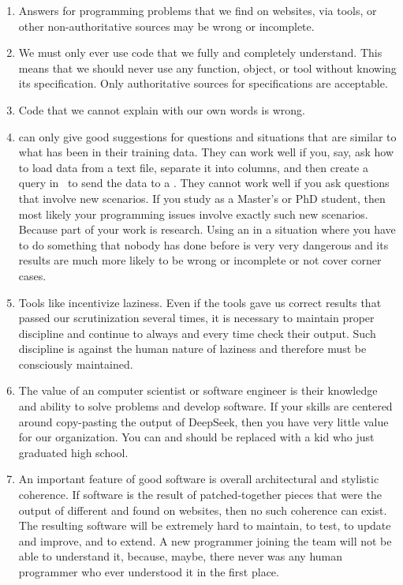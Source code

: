 \begin{enumerate}%
%
\item Answers for programming problems that we find on websites, via  tools, or other non-authoritative sources may be wrong or incomplete.%
%
\item We must only ever use code that we fully and completely understand. %
This means that we should never use any function, object, or tool without knowing its specification. %
Only authoritative sources for specifications are acceptable.%
%
\item Code that we cannot explain with our own words is wrong.%
%
\item {} can only give good suggestions for questions and situations that are similar to what has been in their training data. %
They can work well if you, say, ask how to load data from a text file, separate it into columns, and then create a  query in \sql\ to send the data to a \dbms. %
They cannot work well if you ask questions that involve new scenarios. %
If you study as a Master's or PhD student, then most likely your programming issues involve exactly such new scenarios. %
Because part of your work is research. %
Using an  in a situation where you have to do something that nobody has done before is very very dangerous and its results are much more likely to be wrong or incomplete or not cover corner cases.%
%
\item Tools like  incentivize laziness. %
Even if the tools gave us correct results that passed our scrutinization several times, it is necessary to maintain proper discipline and continue to always and every time check their output. %
Such discipline is against the human nature of laziness and therefore must be consciously maintained.%
%
\item The value of an computer scientist or software engineer is their knowledge and ability to solve problems and develop software. %
If your skills are centered around copy-pasting the output of DeepSeek, then you have very little value for our organization. %
You can and should be replaced with a kid who just graduated high school.%
%
\item An important feature of good software is overall architectural and stylistic coherence. %
If software is the result of patched-together pieces that were the output of different  and found on websites, then no such coherence can exist. %
The resulting software will be extremely hard to maintain, to test, to update and improve, and to extend. %
A new programmer joining the team will not be able to understand it, because, maybe, there never was any human programmer who ever understood it in the first place.%
%
\end{enumerate}%
